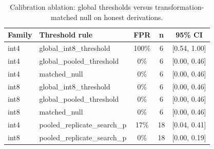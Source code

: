 \begin{table}[t]
\centering
\caption{Calibration ablation: global thresholds versus transformation-matched null on honest derivations.}
\label{tab:calibration}
\footnotesize
\begin{tabular}{llccc}
\toprule
Family & Threshold rule & FPR & n & 95\% CI \\
\midrule
int4 & global\_int8\_threshold & 100\% & 6 & [0.54, 1.00] \\
int4 & global\_pooled\_threshold & 0\% & 6 & [0.00, 0.46] \\
int4 & matched\_null & 0\% & 6 & [0.00, 0.46] \\
int8 & global\_int8\_threshold & 0\% & 6 & [0.00, 0.46] \\
int8 & global\_pooled\_threshold & 0\% & 6 & [0.00, 0.46] \\
int8 & matched\_null & 0\% & 6 & [0.00, 0.46] \\
int4 & pooled\_replicate\_search\_p & 17\% & 18 & [0.04, 0.41] \\
int8 & pooled\_replicate\_search\_p & 0\% & 18 & [0.00, 0.19] \\
\bottomrule
\end{tabular}
\end{table}